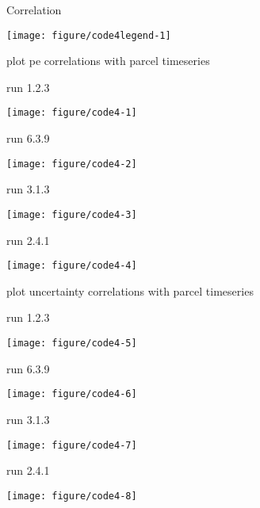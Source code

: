 \documentclass[letterpaper]{article}\usepackage[]{graphicx}\usepackage[]{xcolor}
\makeatletter
\def\maxwidth{ %
  \ifdim\Gin@nat@width>\linewidth
    \linewidth
  \else
    \Gin@nat@width
  \fi
}
\newenvironment{knitrout}{}{} %
\makeatother
\begin{document}
\newpage
\noindent Correlation  \par
\vspace{0.4 cm}

\begin{knitrout}
\color{fgcolor}

{\centering \texttt{[image: figure/code4legend-1]} 

}


\end{knitrout}

\vspace{0.2 cm}




plot pe correlations with parcel timeseries

run 1.2.3

{\centering \texttt{[image: figure/code4-1]} 

}




run 6.3.9

{\centering \texttt{[image: figure/code4-2]} 

}




run 3.1.3

{\centering \texttt{[image: figure/code4-3]} 

}




run 2.4.1

{\centering \texttt{[image: figure/code4-4]} 

}



\newpage


plot uncertainty correlations with parcel timeseries

run 1.2.3

{\centering \texttt{[image: figure/code4-5]} 

}




run 6.3.9

{\centering \texttt{[image: figure/code4-6]} 

}




run 3.1.3

{\centering \texttt{[image: figure/code4-7]} 

}




run 2.4.1

{\centering \texttt{[image: figure/code4-8]} 

}



\newpage
\end{document}
